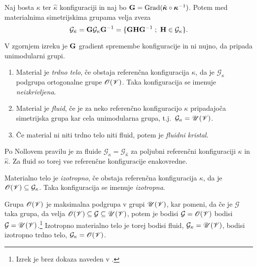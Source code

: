 \begin{izrek}
	Naj bosta $\kappa$ ter $\hat{\kappa}$ konfiguraciji in naj bo
	$\mathbf G=\mathrm{Grad}(\hat{\boldsymbol \kappa}\circ\boldsymbol \kappa^{-1})$. Potem
	med materialnima simetrijskima grupama velja zveza
	\[
		\mathcal{G}_{\hat{\kappa}}=\ten{G}\mathcal{G}_{\kappa}\ten{G}^{-1}
		=\{\ten{G}\ten{H}\ten{G}^{-1}\;;\ \ten{H}\in\mathcal{G}_{\kappa}\}.
	\]
\end{izrek}

V zgornjem izreku je $\mathbf G$ gradient spremembe konfiguracije in ni nujno,
da pripada unimodularni grupi.

\begin{definicija}
	\begin{enumerate}
		\item Material je \emph{trdno telo}, če obstaja referenčna konfiguracija $\kappa$, da je
		$\mathcal{G}_{\kappa}$ podgrupa ortogonalne grupe $\mathscr{O}(\mathscr V)$.
		Taka konfiguracija se imenuje \emph{neizkrivljena}.
		\item Material je \emph{fluid}, če je za neko referenčno konfiguracijo $\kappa$
		pripadajoča simetrijska grupa kar cela unimodularna grupa,
		t.j.~$\mathcal{G}_{\kappa}=\mathscr{U}(\mathscr V)$.
		\item Če material ni niti trdno telo niti fluid, potem je \emph{fluidni kristal}.
	\end{enumerate}
\end{definicija}

Po Nollovem pravilu je za fluide $\mathcal{G}_{\kappa}=\mathcal{G}_{\hat{\kappa}}$
za poljubni referenčni konfiguraciji $\kappa$ in $\hat{\kappa}$. Za fluid so torej
vse referenčne konfiguracije enakovredne.

\begin{definicija}
	Materialno telo je \emph{izotropno}, če obstaja referenčna konfiguracija $\kappa$,
	da je $\mathscr{O}(\mathscr V)\subseteq\mathcal{G}_{\kappa}$. Taka konfiguracija
	se imenuje \emph{izotropna}.
\end{definicija}

Grupa $\mathscr{O}(\mathscr V)$ je maksimalna podgrupa v grupi $\mathscr{U}(\mathscr V)$, kar pomeni,
da če je $\mathcal{G}$ taka grupa, da velja $\mathscr{O}(\mathscr V)\subseteq\mathcal{G}\subseteq\mathscr{U}(\mathscr V)$,
potem je bodisi $\mathcal{G}=\mathscr{O}(\mathscr V)$ bodisi $\mathcal{G}=\mathscr{U}(\mathscr V)$.\footnote{
Izrek je brez dokaza naveden v \cite[str.~88]{liu}.}
Izotropno materialno telo je torej bodisi fluid, $\mathcal{G}_{\kappa}=\mathscr{U}(\mathscr V)$,
bodisi izotropno trdno telo, $\mathcal{G}_{\kappa}=\mathscr{O}(\mathscr V)$.

